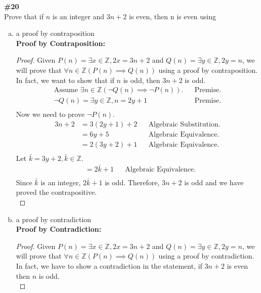 \documentclass{article}
\newcommand{\problem}[1]{\textbf{\##1}\\}
\newcommand{\AllIntegers}{\mathbb{Z}}
\begin{document}
\pagebreak
\problem{20}
Prove that if \(n\) is an integer and \(3n + 2\) is even, then n is even using\\
\begin{enumerate}[a)]
    \item a proof by contraposition\\
    \textbf{Proof by Contraposition:}
    \begin{proof}
        Given \(P(n) = \exists x \in \AllIntegers, 2x = 3n + 2\) and \(Q(n) = \exists y \in \AllIntegers, 2y = n\), we will prove that \(\forall n \in \AllIntegers(P(n)\implies Q(n))\) using a proof by contraposition. In fact, we want to show that if \(n\) is odd, then \(3n + 2\) is odd.\\
        \begin{align*}
            \text{Assume } \exists n \in \AllIntegers(\neg Q(n) \implies \neg P(n)).&&\text{Premise.}\\
            \neg Q(n) = \exists y \in \AllIntegers,n = 2y + 1&&\text{Premise.}\\
        \end{align*}
        Now we need to prove \(\neg P(n)\).\\
        \begin{align*}
            3n + 2 &= 3(2y + 1) + 2&&\text{Algebraic Substitution.}\\
            &= 6y + 5 &&\text{Algebraic Equivalence.}\\
            & = 2(3y + 2) + 1&&\text{Algebraic Equivalence.}\\
        \end{align*}
        Let \(\bar{k}=3y+2, \bar{k}\in\AllIntegers.\)
        \begin{align*}
            &= 2\bar{k} + 1&&\text{Algebraic Equivalence.}\\
        \end{align*}
        Since \(\bar{k}\) is an integer, \(2\bar{k}+1\) is odd. Therefore, \(3n + 2\) is odd and we have proved the contrapositive.\\
    \end{proof}
    \pagebreak
    \item a proof by contradiction\\
    \textbf{Proof by Contradiction:}\\
    \begin{proof}
        Given \(P(n) = \exists x \in \AllIntegers, 2x = 3n + 2\) and \(Q(n) = \exists y \in \AllIntegers, 2y = n\), we will prove that \(\forall n \in \AllIntegers(P(n)\implies Q(n))\) using a proof by contradiction. In fact, we have to show a contradiction in the statement, if \(3n+2\) is even then \(n\) is odd.\\

\end{proof}
\end{enumerate}
\end{document}
